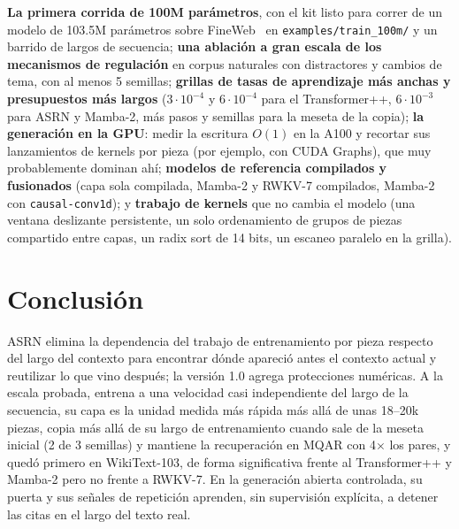 \documentclass[11pt]{article}
\begin{document}
\textbf{La primera corrida de 100M parámetros}, con el kit listo para correr de un modelo de 103.5M parámetros sobre
FineWeb~\cite{penedo2024fineweb} en \nolinkurl{examples/train_100m/} y un barrido de largos de secuencia; \textbf{una
ablación a gran escala de los mecanismos de regulación} en corpus naturales con distractores y cambios de tema, con al
menos 5 semillas; \textbf{grillas de tasas de aprendizaje más anchas y presupuestos más largos} ($3\cdot10^{-4}$ y
$6\cdot10^{-4}$ para el Transformer++, $6\cdot10^{-3}$ para ASRN y Mamba-2, más pasos y semillas para la meseta de la
copia); \textbf{la generación en la GPU}: medir la escritura $O(1)$ en la A100 y recortar sus lanzamientos de kernels
por pieza (por ejemplo, con CUDA Graphs), que muy probablemente dominan ahí; \textbf{modelos de referencia compilados y
fusionados} (capa sola compilada, Mamba-2 y RWKV-7 compilados, Mamba-2 con \texttt{causal-conv1d}); y
\textbf{trabajo de kernels} que no cambia el modelo (una ventana deslizante persistente, un solo ordenamiento de grupos
de piezas compartido entre capas, un radix sort de 14 bits, un escaneo paralelo en la grilla).

\section{Conclusión}

ASRN elimina la dependencia del trabajo de entrenamiento por pieza respecto del largo del contexto para encontrar dónde
apareció antes el contexto actual y reutilizar lo que vino después; la versión 1.0 agrega protecciones numéricas. A la
escala probada, entrena a una velocidad casi independiente del largo de la secuencia, su capa es la unidad medida más
rápida más allá de unas 18--20k piezas, copia más allá de su largo de entrenamiento cuando sale de la meseta inicial (2
de 3 semillas) y mantiene la recuperación en MQAR con 4$\times$ los pares, y quedó primero en WikiText-103, de forma
significativa frente al Transformer++ y Mamba-2 pero no frente a RWKV-7. En la generación abierta controlada, su puerta
y sus señales de repetición aprenden, sin supervisión explícita, a detener las citas en el largo del texto real.
\end{document}
